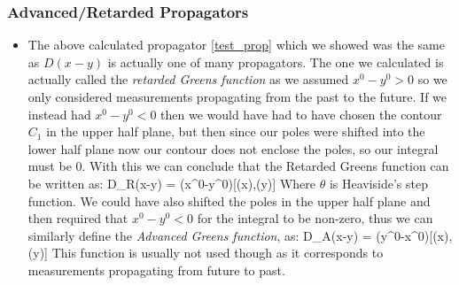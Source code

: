 \documentclass[11pt]{article}
\renewenvironment{flalign}{\vspace{-2mm}\empheq[box=\tcbhighmath]{align}}{\endempheq}
\numberwithin{equation}{section}
\begin{document}
\subsubsection{Advanced/Retarded Propagators}
\begin{itemize}
  \item The above calculated propagator \ref{test_prop} which we showed was the same as $D(x-y)$ is actually one of many propagators. The one we calculated is actually called the \emph{retarded Greens function} as we assumed $x^{0}-y^{0}>0$ so we only considered measurements propagating from the past to the future. If we instead had $x^{0}-y^{0}<0$ then we would have had to have chosen the contour $C_1$ in the upper half plane, but then since our poles were shifted into the lower half plane now our contour does not enclose the poles, so our integral must be $0$. With this we can conclude that the Retarded Greens function can be written as:
  \begin{flalign}
  \label{retard}
    D_{R}(x-y) = \theta(x^{0}-y^{0})[\phi(x),\phi(y)]
  \end{flalign}
  Where $\theta$ is Heaviside's step function. We could have also shifted the poles in the upper half plane and then required that $x^{0}-y^{0}<0$ for the integral to be non-zero, thus we can similarly define the \emph{Advanced Greens function}, as:
    \begin{flalign}
    \label{advanced}
    D_{A}(x-y) = \theta(y^{0}-x^{0})[\phi(x),\phi(y)]
  \end{flalign} 
  This function is usually not used though as it corresponds to measurements propagating from future to past. 
\end{itemize}
\end{document}
